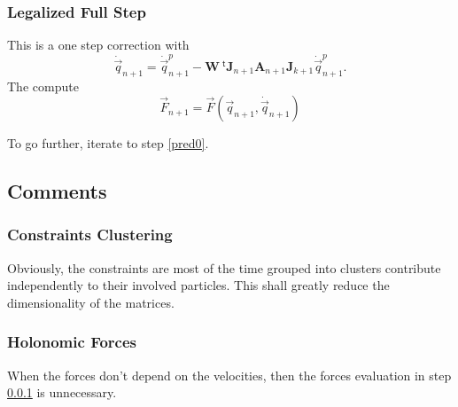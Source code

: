 \documentclass[11pt,aps,twocolumn]{revtex4}
\newcommand{\mymat}[1]{\boldsymbol{#1}}
\newcommand{\mytrn}[1]{{\!\!~^{\mathsf{t}}{#1}}}
\newcommand{\q}{\vec{q}}
\newcommand{\dq}{\dot{\q}}
\newcommand{\J}{\mymat{J}}
\newcommand{\tJ}{\mytrn{\J}}
\newcommand{\W}{\mymat{W}}
\newcommand{\A}{\mymat{A}}
\begin{document}
\subsubsection{Legalized Full Step}
\label{final}
This is a one step correction with
$$
	\dq_{n+1} = \dq_{n+1}^p - \W\tJ_{n+1} \A_{n+1} \J_{k+1} \dq_{n+1}^p.
$$
The compute
$$
	\vec{F}_{n+1} = \vec{F}\left(\q_{n+1},\dq_{n+1}\right)
$$

To go further, iterate to step \ref{pred0}.

\subsection{Comments}

\subsubsection{Constraints Clustering}
Obviously, the constraints are most of the time grouped into clusters contribute
independently to their involved particles. This shall greatly reduce the dimensionality of the matrices.

\subsubsection{Holonomic Forces}
When the forces don't depend on the velocities, then the forces evaluation in step \ref{final} is unnecessary.
\end{document}
